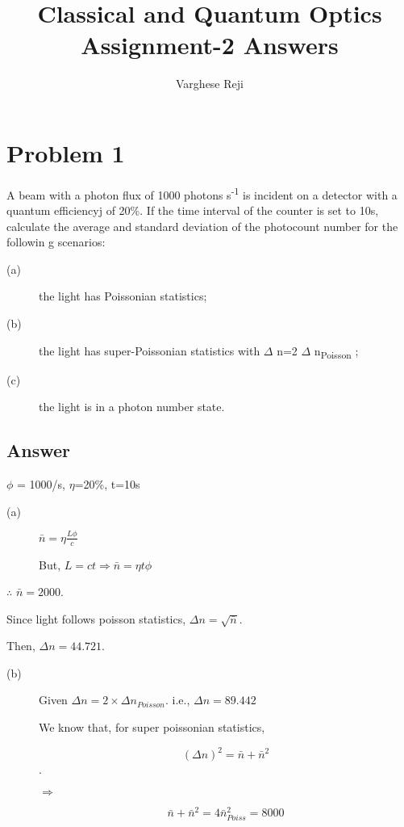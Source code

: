 \documentclass[a4paper,11pt]{article}
\author{Varghese Reji}
\date{}
\title{Classical and Quantum Optics\\\medskip
\large Assignment-2 Answers}
\begin{document}
\maketitle

\section*{Problem 1}
\label{sec:orgd4f9378}

A beam with a photon flux of 1000 photons s\textsuperscript{-1} is incident on a detector with a quantum efficiencyj of 20\%. If the time interval of the counter is set to 10s, calculate the average and standard deviation of the photocount number for the followin g scenarios:
\begin{description}
\item[{(a)}] the light has Poissonian statistics;
\item[{(b)}] the light has super-Poissonian statistics with \(\Delta\) n=2\texttimes{} \(\Delta\) n\textsubscript{Poisson} ;
\item[{(c)}] the light is in a photon number state.
\end{description}

\subsection*{Answer}
\label{sec:org7dbd680}
\(\phi\) = 1000/s, \(\eta\)=20\%, t=10s

\begin{description}
\item[{(a)}] \(\bar{n} = \eta \frac{L \phi}{c}\)

But, \(L=ct \Rightarrow \bar{n} = \eta t \phi\)
\end{description}
\(\therefore\) \(\bar{n} = 2000\).

Since light follows poisson statistics, \(\Delta n =\sqrt{\bar{n}}\).

Then, \(\Delta n = 44.721\).

\begin{description}
\item[{(b)}] Given \(\Delta n = 2\times \Delta n_{Poisson}\).
i.e., \(\Delta n = 89.442\)

We know that, for super poissonian statistics,

$$(\Delta n)^2 = \bar{n} + \bar{n}^2$$.

\(\Rightarrow\)

$$ \bar{n} + \bar{n}^2 = 4 \bar{n}_{Poiss}^2 = 8000$$
\end{description}
\end{document}
